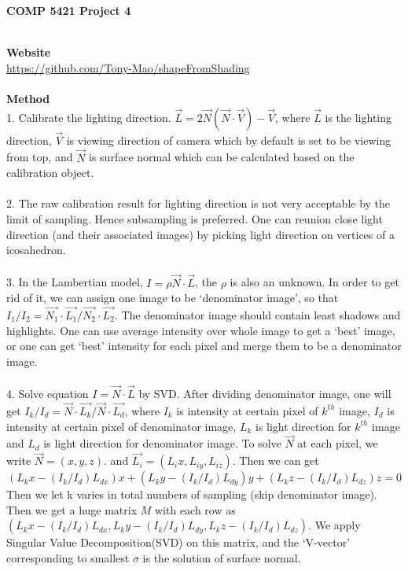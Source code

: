 \documentclass [12pt] {article}
\begin{document}
\begin{spacing}{1.5}
\noindent

\begin {flushright}
\textbf{COMP 5421 Project 4}\\
\end {flushright}
~\\
\noindent
\textbf{Website}\\ 
\url{https://github.com/Tony-Mao/shapeFromShading}\\
~\\
\textbf{Method}\\
1. Calibrate the lighting direction. $\vec{L} = 2\vec{N}(\vec{N}\cdot \vec{V})-\vec{V}$, where $\vec{L}$ is the lighting direction, $\vec{V}$ is viewing direction of camera which by default is set to be viewing from top, and $\vec{N}$ is surface normal which can be calculated based on the calibration object.\\
~\\
2. The raw calibration result for lighting direction is not very acceptable by the limit of sampling. Hence subsampling is preferred. One can reunion close light direction (and their associated images) by picking light direction on vertices of a icosahedron.\\
~\\
3. In the Lambertian model, $I = \rho \vec{N} \cdot \vec{L}$, the $\rho$ is also an unknown. In order to get rid of it, we can assign one image to be `denominator image', so that $I_{1}/I_{2} = \vec{N_{1}} \cdot \vec{L_{1}}/ \vec{N_{2}} \cdot \vec{L_{2}}$. The denominator image should contain least shadows and highlights. One can use average intensity over whole image to get a `best' image, or one can get `best' intensity for each pixel and merge them to be a denominator image.\\
~\\
4. Solve equation $I = \vec{N} \cdot \vec{L}$ by SVD. After dividing denominator image, one will get $I_{k}/I_{d} = \vec{N} \cdot \vec{L_{k}}/ \vec{N} \cdot \vec{L_{d}}$, where $I_{k}$ is intensity at certain pixel of $k^{th}$ image, $I_{d}$ is intensity at certain pixel of denominator image, $L_{k}$ is light direction for $k^{th}$ image and $L_{d}$ is light direction for denominator image. To solve $\vec{N}$ at each pixel, we write $\vec{N} = (x, y, z)$. and $\vec{L_{i}} = (L{_ix}, L_{iy}, L_{iz})$. Then we can get $$(L{_kx}-(I_{k}/I_{d}) L_{dx})x+ (L{_ky}-(I_{k}/I_{d}) L_{dy})y+ (L{_kz}-(I_{k}/I_{d}) L_{dz})z = 0$$ Then we let k varies in total numbers of sampling (skip denominator image). Then we get a huge matrix $M$ with each row as $(L{_kx}-(I_{k}/I_{d}) L_{dx}, L{_ky}-(I_{k}/I_{d}) L_{dy}, L{_kz}-(I_{k}/I_{d}) L_{dz})$. We apply Singular Value Decomposition(SVD) on this matrix, and the `V-vector' corresponding to  smallest $\sigma$ is the solution of surface normal. \\

\end{spacing}
\end{document}
